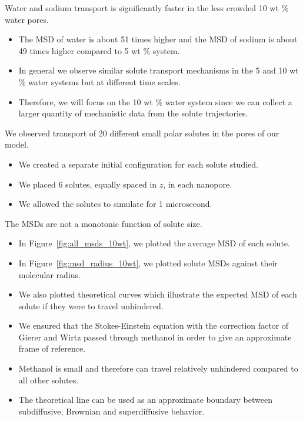 \documentclass{article}
\begin{document}
  \noindent Water and sodium transport is significantly faster in the less
  crowded 10 wt \% water pores. 
  \begin{itemize}
    \item The MSD of water is about 51 times higher and the MSD of sodium is
    about 49 times higher compared to 5 wt \% system.
    \item In general we observe similar solute transport mechanisms in the 5
    and 10 wt \% water systems but at different time scales.
    \item Therefore, we will focus on the 10 wt \% water system since we
    can collect a larger quantity of mechanistic data from the solute 
    trajectories.
  \end{itemize}
  
  \noindent We observed transport of 20 different small polar solutes in the
  pores of our model. 
  \begin{itemize}
    \item We created a separate initial configuration for each solute studied.
    \item We placed 6 solutes, equally spaced in $z$, in each nanopore.
    \item We allowed the solutes to simulate for 1 microsecond. 
  \end{itemize}
  
  \noindent The MSDs are not a monotonic function of solute size.
  \begin{itemize}
    \item In Figure~\ref{fig:all_msds_10wt}, we plotted the average
    MSD of each solute. 
    \item In Figure~\ref{fig:msd_radius_10wt}, we plotted solute
    MSDs against their molecular radius.
    \item We also plotted theoretical curves which illustrate the 
    expected MSD of each solute if they were to travel unhindered.
    \item We ensured that the Stokes-Einstein equation with the
    correction factor of Gierer and Wirtz passed through methanol 
    in order to give an approximate frame of reference. 
    \item Methanol is small and therefore can travel relatively
    unhindered compared to all other solutes.
    \item The theoretical line can be used as an approximate boundary
    between subdiffusive, Brownian and superdiffusive behavior.
  \end{itemize}
  
\end{document}
